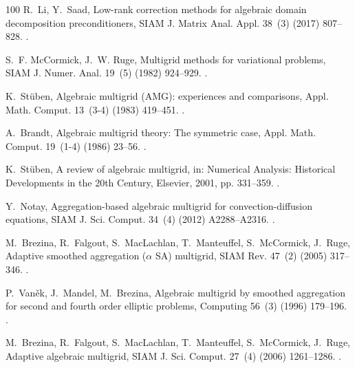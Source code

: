 \documentclass[3p,times]{elsarticle}
\theoremstyle{plain}
\begin{document}
\begin{thebibliography}{100}
R.~Li, Y.~Saad, {Low-rank correction methods for algebraic domain decomposition
  preconditioners}, SIAM J. Matrix Anal. Appl. 38~(3) (2017) 807--828.
\newblock \href {https://doi.org/10.1137/16M110486X}
  {}.

S.~F. McCormick, J.~W. Ruge, {Multigrid methods for variational problems}, SIAM
  J. Numer. Anal. 19~(5) (1982) 924--929.
\newblock \href {https://doi.org/10.1137/0719067} {}.

K.~St{\"u}ben, {Algebraic multigrid (AMG): experiences and comparisons}, Appl.
  Math. Comput. 13~(3-4) (1983) 419--451.
\newblock \href {https://doi.org/10.1016/0096-3003(83)90023-1}
  {}.

A.~Brandt, {Algebraic multigrid theory: The symmetric case}, Appl. Math.
  Comput. 19~(1-4) (1986) 23--56.
\newblock \href {https://doi.org/10.1016/0096-3003(86)90095-0}
  {}.

K.~St{\"u}ben, {A review of algebraic multigrid}, in: Numerical Analysis:
  Historical Developments in the 20th Century, Elsevier, 2001, pp. 331--359.
\newblock \href {https://doi.org/10.1016/B978-0-444-50617-7.50015-X}
  {}.

Y.~Notay, {Aggregation-based algebraic multigrid for convection-diffusion
  equations}, SIAM J. Sci. Comput. 34~(4) (2012) A2288--A2316.
\newblock \href {https://doi.org/10.1137/110835347}
  {}.

M.~Brezina, R.~Falgout, S.~MacLachlan, T.~Manteuffel, S.~McCormick, J.~Ruge,
  {Adaptive smoothed aggregation ($\alpha$ SA) multigrid}, SIAM Rev. 47~(2)
  (2005) 317--346.
\newblock \href {https://doi.org/10.1137/050626272}
  {}.

P.~Van{\v{e}}k, J.~Mandel, M.~Brezina, {Algebraic multigrid by smoothed
  aggregation for second and fourth order elliptic problems}, Computing 56~(3)
  (1996) 179--196.
\newblock \href {https://doi.org/10.1007/BF02238511}
  {}.

M.~Brezina, R.~Falgout, S.~MacLachlan, T.~Manteuffel, S.~McCormick, J.~Ruge,
  {Adaptive algebraic multigrid}, SIAM J. Sci. Comput. 27~(4) (2006)
  1261--1286.
\newblock \href {https://doi.org/10.1137/040614402}
  {}.


\end{thebibliography}
\end{document}
